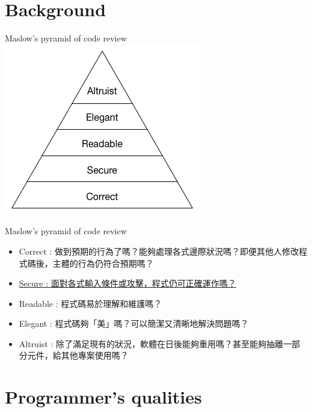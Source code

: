 \documentclass{beamer}
\begin{document}
\begin{CJK*}{UTF8}{bsmi}
    \section{Background}
    \begin{frame}{Maslow’s pyramid of code review}
        \centering\includegraphics[height=.9\textheight]{Maslow.png}
    \end{frame}

    \begin{frame}{Maslow’s pyramid of code review}
        \begin{itemize}
            \item  Correct  : 做到預期的行為了嗎？能夠處理各式邊際狀況嗎？即便其他人修改程式碼後，主體的行為仍符合預期嗎？
            \item  \underline{Secure : 面對各式輸入條件或攻擊，程式仍可正確運作嗎？}
            \item  Readable : 程式碼易於理解和維護嗎？
            \item  Elegant  : 程式碼夠「美」嗎？可以簡潔又清晰地解決問題嗎？
            \item  Altruist : 除了滿足現有的狀況，軟體在日後能夠重用嗎？甚至能夠抽離一部分元件，給其他專案使用嗎？
        \end{itemize}
    \end{frame}

    \section{Programmer's qualities}


\end{CJK*}
\end{document}
